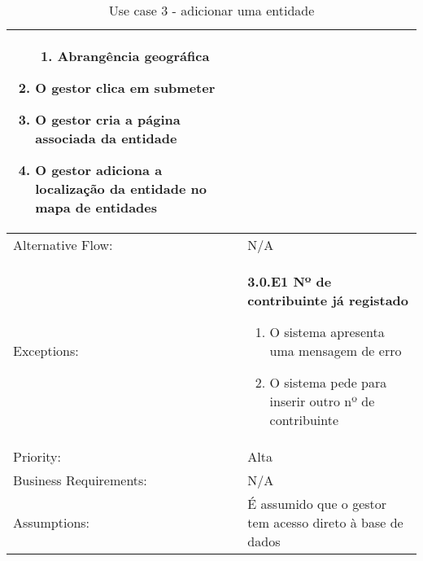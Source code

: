\documentclass{scrreprt}
\begin{document}
\begin{table}[H]
\begin{adjustbox}{width=1.15\textwidth,center=\textwidth}
\begin{tabular}{|m{4cm}|m{12cm}|}
\begin{enumerate}
\begin{enumerate}
                    \item Abrangência geográfica
                \end{enumerate}
                \item O gestor clica em submeter
                \item O gestor cria a página associada da entidade
                \item O gestor adiciona  a localização da entidade no mapa de entidades
            \end{enumerate} \\
            \hline
            Alternative Flow: & N/A \\
            \hline
            Exceptions: & \textbf{3.0.E1  Nº de contribuinte já registado}
            \begin{enumerate}
                \item O sistema apresenta uma mensagem de erro
                \item O sistema pede para inserir outro nº de contribuinte
            \end{enumerate} \\
            \hline
            Priority: & Alta \\
            \hline
            Business Requirements: & N/A \\
            \hline
            Assumptions: & É assumido que o gestor tem acesso direto à base de dados \\
            \hline
        \end{tabular}
    \end{adjustbox}
    \caption{Use case 3 - adicionar uma entidade}
    \label{use case 3}
\end{table}
\end{document}
